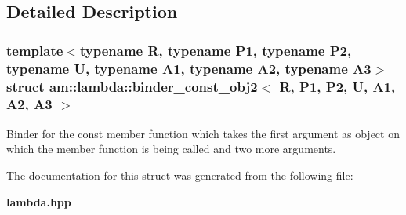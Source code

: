 \subsection{Detailed Description}
\subsubsection*{template$<$typename R, typename P1, typename P2, typename U, typename A1, typename A2, typename A3$>$ struct am::lambda::binder\_\-const\_\-obj2$<$ R, P1, P2, U, A1, A2, A3 $>$}

Binder for the const member function which takes the first argument as object on which the member function is being called and two more arguments. 



The documentation for this struct was generated from the following file:\begin{CompactItemize}
\item 
{\bf lambda.hpp}\end{CompactItemize}
